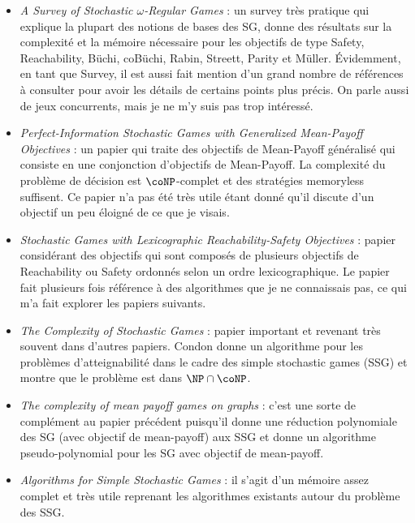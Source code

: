 \documentclass{article}
\theoremstyle{plain}
\begin{document}
\begin{itemize}
\item \textit{A Survey of Stochastic $\omega$-Regular Games} \cite{DBLP:journals/jcss/ChatterjeeH12} : un survey très pratique qui explique la plupart des notions de bases des SG, donne des résultats sur la complexité et la mémoire nécessaire pour les objectifs de type Safety, Reachability, Büchi, coBüchi, Rabin, Streett, Parity et Müller. Évidemment, en tant que Survey, il est aussi fait mention d'un grand nombre de références à consulter pour avoir les détails de certains points plus précis. On parle aussi de jeux concurrents, mais je ne m'y suis pas trop intéressé.

\item \textit{Perfect-Information Stochastic Games with Generalized Mean-Payoff Objectives} \cite{DBLP:journals/corr/Chatterjee016} : un papier qui traite des objectifs de Mean-Payoff généralisé qui consiste en une conjonction d'objectifs de Mean-Payoff. La complexité du problème de décision est $\coNP$-complet et des stratégies memoryless suffisent. Ce papier n'a pas été très utile étant donné qu'il discute d'un objectif un peu éloigné de ce que je visais.

\item \textit{Stochastic Games with Lexicographic Reachability-Safety Objectives} \cite{DBLP:journals/corr/abs-2005-04018} : papier considérant des objectifs qui sont composés de plusieurs objectifs de Reachability ou Safety ordonnés selon un ordre lexicographique. Le papier fait plusieurs fois référence à des algorithmes que je ne connaissais pas, ce qui m'a fait explorer les papiers suivants.

\item \textit{The Complexity of Stochastic Games} \cite{DBLP:journals/iandc/Condon92} : papier important et revenant très souvent dans d'autres papiers. Condon donne un algorithme pour les problèmes d'atteignabilité dans le cadre des simple stochastic games (SSG) et montre que le problème est dans $\NP \cap \coNP$.

\item \textit{The complexity of mean payoff games on graphs} \cite{DBLP:journals/tcs/ZwickP96} : c'est une sorte de complément au papier précédent puisqu'il donne une réduction polynomiale des SG (avec objectif de mean-payoff) aux SSG et donne un algorithme pseudo-polynomial pour les SG avec objectif de mean-payoff.

\item \textit{Algorithms for Simple Stochastic Games} \cite{MemoireSSG} : il s'agit d'un mémoire assez complet et très utile reprenant les algorithmes existants autour du problème des SSG.


\end{itemize}
\end{document}
